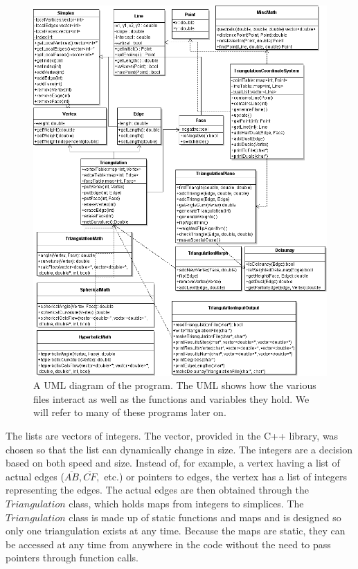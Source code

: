 \documentclass[12pt]{article}
\begin{document}
\begin{figure}
\begin{center}
\includegraphics[scale = 0.47]{Pictures/triangulationUML.png}
\end{center}
\caption{A UML diagram of the program. The UML shows how the various files interact as well as the functions and variables they hold. We will refer to many of these programs later on.}
\label{triUML}
\end{figure}

\noindent The lists are vectors of integers. The vector, provided in the C++ library, was chosen so that the list can dynamically change in size. The integers are a decision based on both speed and size. Instead of, for example, a vertex having a list of actual edges ($\overline{AB}, \overline{CF},$ etc.) or pointers to edges, the vertex has a list of integers representing the edges. The actual edges are then obtained through the $Triangulation$ class, which holds maps from integers to simplices. The $Triangulation$ class is made up of static functions and maps and is designed so only one triangulation exists at any time. Because the maps are static, they can be accessed at any time from anywhere in the code without the need to pass pointers through function calls. \newline
\end{document}
